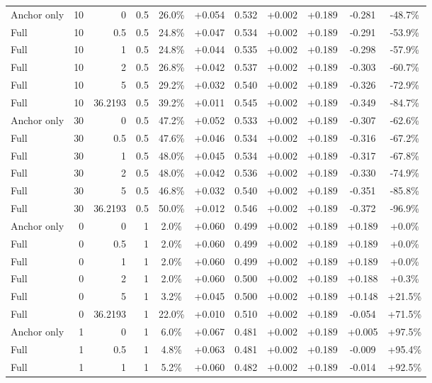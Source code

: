 \begin{table}[htbp]
\begin{tabular}{lrrrccccccc}
Anchor only & 10 & 0 & 0.5 & 26.0\% & +0.054 & 0.532 & +0.002 & +0.189 & -0.281 & -48.7\% \\
Full & 10 & 0.5 & 0.5 & 24.8\% & +0.047 & 0.534 & +0.002 & +0.189 & -0.291 & -53.9\% \\
Full & 10 & 1 & 0.5 & 24.8\% & +0.044 & 0.535 & +0.002 & +0.189 & -0.298 & -57.9\% \\
Full & 10 & 2 & 0.5 & 26.8\% & +0.042 & 0.537 & +0.002 & +0.189 & -0.303 & -60.7\% \\
Full & 10 & 5 & 0.5 & 29.2\% & +0.032 & 0.540 & +0.002 & +0.189 & -0.326 & -72.9\% \\
Full & 10 & 36.2193 & 0.5 & 39.2\% & +0.011 & 0.545 & +0.002 & +0.189 & -0.349 & -84.7\% \\
Anchor only & 30 & 0 & 0.5 & 47.2\% & +0.052 & 0.533 & +0.002 & +0.189 & -0.307 & -62.6\% \\
Full & 30 & 0.5 & 0.5 & 47.6\% & +0.046 & 0.534 & +0.002 & +0.189 & -0.316 & -67.2\% \\
Full & 30 & 1 & 0.5 & 48.0\% & +0.045 & 0.534 & +0.002 & +0.189 & -0.317 & -67.8\% \\
Full & 30 & 2 & 0.5 & 48.0\% & +0.042 & 0.536 & +0.002 & +0.189 & -0.330 & -74.9\% \\
Full & 30 & 5 & 0.5 & 46.8\% & +0.032 & 0.540 & +0.002 & +0.189 & -0.351 & -85.8\% \\
Full & 30 & 36.2193 & 0.5 & 50.0\% & +0.012 & 0.546 & +0.002 & +0.189 & -0.372 & -96.9\% \\
Anchor only & 0 & 0 & 1 & 2.0\% & +0.060 & 0.499 & +0.002 & +0.189 & +0.189 & +0.0\% \\
Full & 0 & 0.5 & 1 & 2.0\% & +0.060 & 0.499 & +0.002 & +0.189 & +0.189 & +0.0\% \\
Full & 0 & 1 & 1 & 2.0\% & +0.060 & 0.499 & +0.002 & +0.189 & +0.189 & +0.0\% \\
Full & 0 & 2 & 1 & 2.0\% & +0.060 & 0.500 & +0.002 & +0.189 & +0.188 & +0.3\% \\
Full & 0 & 5 & 1 & 3.2\% & +0.045 & 0.500 & +0.002 & +0.189 & +0.148 & +21.5\% \\
Full & 0 & 36.2193 & 1 & 22.0\% & +0.010 & 0.510 & +0.002 & +0.189 & -0.054 & +71.5\% \\
Anchor only & 1 & 0 & 1 & 6.0\% & +0.067 & 0.481 & +0.002 & +0.189 & +0.005 & +97.5\% \\
Full & 1 & 0.5 & 1 & 4.8\% & +0.063 & 0.481 & +0.002 & +0.189 & -0.009 & +95.4\% \\
Full & 1 & 1 & 1 & 5.2\% & +0.060 & 0.482 & +0.002 & +0.189 & -0.014 & +92.5\% \\

\end{tabular}
\end{table}
